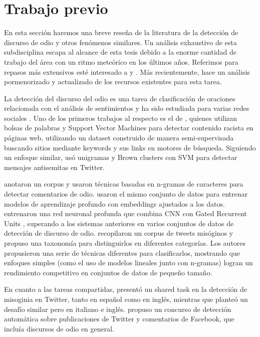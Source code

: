 

\section{Trabajo previo}

En esta sección haremos una breve reseña de la literatura de la detección de discurso de odio y otros fenómenos similares. Un análisis exhaustivo de esta subdisciplina escapa al alcance de esta tesis debido a la enorme cantidad de trabajo del área con un ritmo meteórico en los últimos años. Referimos para repasos más extensivos esté interesado a \citet{schmidt2017survey} y \citet{fortuna2018survey}. Más recientemente, \citet{poletto2021resources} hace un análisis pormenorizado y actualizado de los recursos existentes para esta tarea.

La detección del discurso del odio es una tarea de clasificación de oraciones relacionada con el análisis de sentimientos y ha sido estudiada para varias redes sociales \cite{thelwall2008social, pak2010twitter, saleem2017web}. Uno de los primeros trabajos al respecto es el de \citet{greevy2004classifying}, quienes utilizan bolsas de palabras y Support Vector Machines para detectar contenido racista en páginas web, utilizando un dataset construido de manera semi-supervisada buscando sitios mediante keywords y sus links en motores de búsqueda. Siguiendo un enfoque similar, \citet{warner2012detecting} usó unigramas y Brown clusters \cite{brown1992class} con SVM para detectar mensajes antisemitas en Twitter.

\citet{waseem2016hateful} anotaron un corpus y usaron técnicas basadas en n-gramas de caracteres para detectar comentarios de odio. \citet{badjatiya2017deep} usaron el mismo conjunto de datos para entrenar modelos de aprendizaje profundo con embeddings ajustados a los datos. \citet{zhang2018detecting} entrenaron una red neuronal profunda que combina CNN con Gated Recurrent Units \cite{cho2014learning}, superando a los sistemas anteriores en varios conjuntos de datos de detección de discurso de odio. \citet{anzovino2018automatic} recopilaron un corpus de tweets misóginos y propuso una taxonomía para distinguirlos en diferentes categorías. Los autores propusieron una serie de técnicas diferentes para clasificarlos, mostrando que enfoques simples (como el uso de modelos lineales junto con n-gramas) logran un rendimiento competitivo en conjuntos de datos de pequeño tamaño.

En cuanto a las tareas compartidas, \citet{fersini2018overview} presentó un shared task en la detección de misoginia en Twitter, tanto en español como en inglés, mientras que \citet{fersini2018evalitaoverview} planteó un desafío similar pero en italiano e inglés. \citet{bosco2018overview} propuso un concurso de detección automática sobre publicaciones de Twitter y comentarios de Facebook, que incluía discursos de odio en general.

